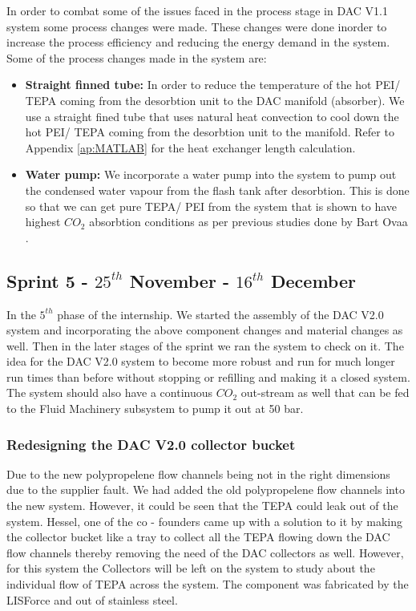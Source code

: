 In order to combat some of the issues faced in the process stage in DAC V1.1 system some process changes were made. These changes were done inorder to increase the process efficiency and reducing the energy demand in the system. Some of the process changes made in the system are: 

\begin{itemize}
    \item \textbf{Straight finned tube: }In order to reduce the temperature of the hot PEI/ TEPA coming from the desorbtion unit to the DAC manifold (absorber). We use a straight fined tube that uses natural heat convection to cool down the hot PEI/ TEPA coming from the desorbtion unit to the manifold. Refer to Appendix \ref{ap:MATLAB} for the heat exchanger length calculation. 
    
    \item \textbf{Water pump: }We incorporate a water pump into the system to pump out the condensed water vapour from the flash tank after desorbtion. This is done so that we can get pure TEPA/ PEI from the system that is shown to have highest $CO_2$ absorbtion conditions as per previous studies done by Bart Ovaa \cite{Ovaa2019}. 

\end{itemize}
  



\subsection{Sprint 5 - $25^{th}$ November - $16^{th}$ December}
\label{sec:sprint5}

In the $5^{th}$ phase of the internship. We started the assembly of the DAC V2.0 system and incorporating the above component changes and material changes as well. Then in the later stages of the sprint we ran the system to check on it. The idea for the DAC V2.0 system to become more robust and run for much longer run times than before without stopping or refilling and making it a closed system. The system should also have a continuous $CO_2$ out-stream as well that can be fed to the Fluid Machinery subsystem to pump it out at 50 bar.

\subsubsection{Redesigning the DAC V2.0 collector bucket}

Due to the new polypropelene flow channels being not in the right dimensions due to the supplier fault. We had added the old polypropelene flow channels into the new system. However, it could be seen that the TEPA could leak out of the system. Hessel, one of the co - founders came up with a solution to it by making the collector bucket like a tray to collect all the TEPA flowing down the DAC flow channels thereby removing the need of the DAC collectors as well. However, for this system the Collectors will be left on the system to study about the individual flow of TEPA across the system. The component was fabricated by the LISForce and out of stainless steel. 

